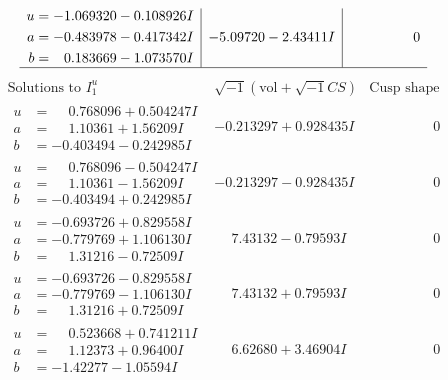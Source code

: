 \documentclass[1p]{elsarticle_modified}
\theoremstyle{definition}
\newcommand{\I}{\sqrt{-1}}
\begin{document}
$$\begin{array}{c|c|c}
\begin{aligned}
u &= -1.069320 - 0.108926 I \\
a &= -0.483978 - 0.417342 I \\
b &= \phantom{-}0.183669 - 1.073570 I\end{aligned}
 & -5.09720 - 2.43411 I & \phantom{-0.000000 } 0\\
 \hline 
 \end{array}$$\newpage$$\begin{array}{c|c|c}  
\text{Solutions to }I^u_{1}& \I (\text{vol} + \sqrt{-1}CS) & \text{Cusp shape}\\
 \hline 
\begin{aligned}
u &= \phantom{-}0.768096 + 0.504247 I \\
a &= \phantom{-}1.10361 + 1.56209 I \\
b &= -0.403494 - 0.242985 I\end{aligned}
 & -0.213297 + 0.928435 I & \phantom{-0.000000 } 0 \\ \hline\begin{aligned}
u &= \phantom{-}0.768096 - 0.504247 I \\
a &= \phantom{-}1.10361 - 1.56209 I \\
b &= -0.403494 + 0.242985 I\end{aligned}
 & -0.213297 - 0.928435 I & \phantom{-0.000000 } 0 \\ \hline\begin{aligned}
u &= -0.693726 + 0.829558 I \\
a &= -0.779769 + 1.106130 I \\
b &= \phantom{-}1.31216 - 0.72509 I\end{aligned}
 & \phantom{-}7.43132 - 0.79593 I & \phantom{-0.000000 } 0 \\ \hline\begin{aligned}
u &= -0.693726 - 0.829558 I \\
a &= -0.779769 - 1.106130 I \\
b &= \phantom{-}1.31216 + 0.72509 I\end{aligned}
 & \phantom{-}7.43132 + 0.79593 I & \phantom{-0.000000 } 0 \\ \hline\begin{aligned}
u &= \phantom{-}0.523668 + 0.741211 I \\
a &= \phantom{-}1.12373 + 0.96400 I \\
b &= -1.42277 - 1.05594 I\end{aligned}
 & \phantom{-}6.62680 + 3.46904 I & \phantom{-0.000000 } 0 \\ \hline\begin{aligned}

\end{aligned}
\end{array}$$
\end{document}
